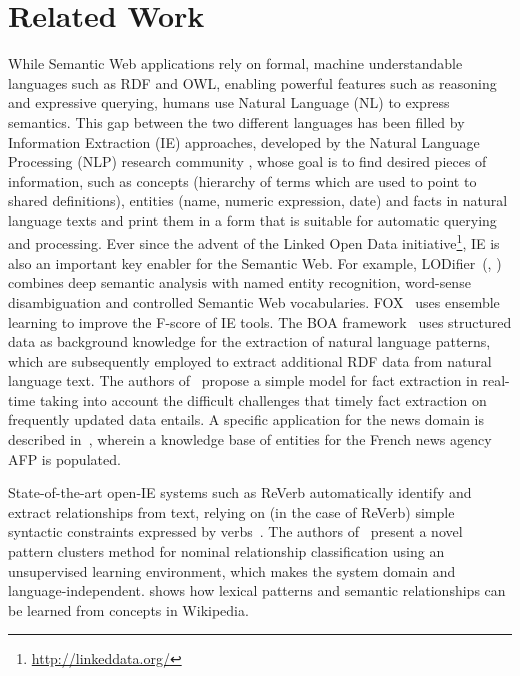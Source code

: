 \documentclass[a4paper]{llncs}
\begin{document}
\section{Related Work}
\label{sec:related_work}
While Semantic Web applications rely on formal, machine understandable languages such as RDF and OWL, enabling powerful features such as reasoning and expressive querying, humans use Natural Language (NL) to express semantics.
This gap between the two different languages has been filled by Information Extraction (IE) approaches, developed by the Natural Language Processing (NLP) research community \cite{Sarawagi:2008:IE:1498844.1498845}, whose goal is to find desired pieces of information, such as concepts (hierarchy of terms which are used to point to shared definitions), entities (name, numeric expression, date) and facts in natural language texts and print them in a form that is suitable for automatic querying and processing.
Ever since the advent of the Linked Open Data initiative\footnote{\url{http://linkeddata.org/}}, IE is also an important key enabler for the Semantic Web.
For example, LODifier~(\cite{lodifier}, \cite{entity_extraction}) combines deep semantic analysis with named entity recognition, word-sense disambiguation and controlled Semantic Web vocabularies.
FOX~\cite{DBLP:conf/semweb/NgomoHLSK11} uses ensemble learning to improve the F-score of IE tools.
The BOA framework~\cite{Gerber2011} uses structured data as background knowledge for the extraction of natural language patterns, which are subsequently employed to extract additional RDF data from natural language text. %
The authors of~\cite{Nakashole:2012:RPK:2391200.2391208} propose a simple model for fact extraction in real-time taking into account the difficult challenges that timely fact extraction on frequently updated data entails.
A specific application for the news domain is described in~\cite{Stern:2012:PKB:2391200.2391207}, wherein a knowledge base of entities for the French news agency AFP is populated.

State-of-the-art open-IE systems such as ReVerb automatically identify and extract relationships from text, relying on (in the case of ReVerb) simple syntactic constraints expressed by verbs~\cite{conf/emnlp/FaderSE11}.
The authors of~\cite{conf/acl/DavidovR08} present a novel pattern clusters method for nominal relationship classification using an unsupervised learning environment, which makes the system domain and language-independent.
\cite{Ruiz-Casado:2007:ALL:1238147.1238395} shows how lexical patterns and semantic relationships can be learned from concepts in Wikipedia.
\end{document}
